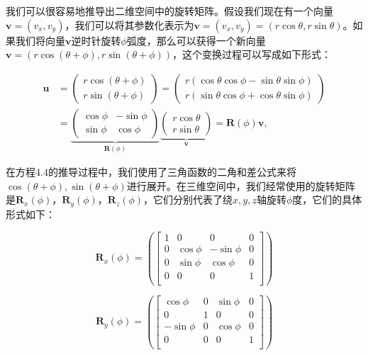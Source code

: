 \documentclass[
  paper=a4,
  ,captions=tableheading
]{scrartcl}
\begin{document}
我们可以很容易地推导出二维空间中的旋转矩阵。假设我们现在有一个向量\(\mathbf{v} = (v_x, v_y)\)，我们可以将其参数化表示为\(\mathbf{v} = (v_x, v_y) = (r \cos \theta, r \sin \theta)\)。如果我们将向量\(\mathbf{v}\)逆时针旋转\(\phi\)弧度，那么可以获得一个新向量\(\mathbf{v} =  (r \cos (\theta + \phi), r \sin (\theta + \phi))\)，这个变换过程可以写成如下形式：

\[
  \begin{aligned} \mathbf{u} & =\left(\begin{array}{c}r \cos (\theta+\phi) \\ r \sin (\theta+\phi)\end{array}\right)=\left(\begin{array}{l}r(\cos \theta \cos \phi-\sin \theta \sin \phi) \\ r(\sin \theta \cos \phi+\cos \theta \sin \phi)\end{array}\right) \\ & =\underbrace{\left(\begin{array}{rr}\cos \phi & -\sin \phi \\ \sin \phi & \cos \phi\end{array}\right)}_{\mathbf{R}(\phi)} \underbrace{\left(\begin{array}{l}r \cos \theta \\ r \sin \theta\end{array}\right)}_{\mathbf{v}}=\mathbf{R}(\phi) \mathbf{v},\end{aligned}\tag{4.4}
\]

在方程4.4的推导过程中，我们使用了三角函数的二角和差公式来将\(\cos (\theta + \phi) ,\sin (\theta + \phi)\)进行展开。在三维空间中，我们经常使用的旋转矩阵是\(\mathbf{R}_x(\phi)\)，\(\mathbf{R}_y(\phi)\)，\(\mathbf{R}_z(\phi)\)，它们分别代表了绕\(x,y,z\)轴旋转\(\phi\)度，它们的具体形式如下：

\[
  \mathbf{R}_x(\phi) =
  \left (
  \begin{bmatrix}
      1 & 0         & 0          & 0 \\
      0 & \cos \phi & -\sin \phi & 0 \\
      0 & \sin \phi & \cos \phi  & 0 \\
      0 & 0         & 0          & 1 \\
    \end{bmatrix}
  \right)
  \tag{4.5}
\]

\[
  \mathbf{R}_y(\phi) =
  \left (
  \begin{bmatrix}
      \cos \phi  & 0 & \sin \phi & 0 \\
      0          & 1 & 0         & 0 \\
      -\sin \phi & 0 & \cos \phi & 0 \\
      0          & 0 & 0         & 1 \\
    \end{bmatrix}
  \right)
  \tag{4.6}
\]
\end{document}
